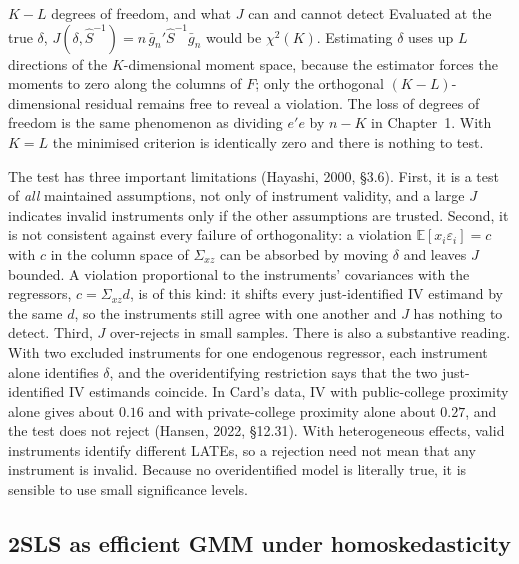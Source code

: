 \documentclass[11pt,a4paper]{article}
\newcommand{\E}{\mathbb{E}}
\newcommand{\sxz}{\Sigma_{xz}}
\begin{document}
\begin{whybox}{$K-L$ degrees of freedom, and what $J$ can and cannot detect}
Evaluated at the true $\delta$, $J(\delta,\hat S^{-1})=n\,\bar g_n'\hat S^{-1}\bar g_n$ would be $\chi^2(K)$. Estimating $\delta$ uses up $L$ directions of the $K$-dimensional moment space, because the estimator forces the moments to zero along the columns of $F$; only the orthogonal $(K-L)$-dimensional residual remains free to reveal a violation. The loss of degrees of freedom is the same phenomenon as dividing $e'e$ by $n-K$ in Chapter~1. With $K=L$ the minimised criterion is identically zero and there is nothing to test.

The test has three important limitations (Hayashi, 2000, \S3.6). First, it is a test of \emph{all} maintained assumptions, not only of instrument validity, and a large $J$ indicates invalid instruments only if the other assumptions are trusted. Second, it is not consistent against every failure of orthogonality: a violation $\E[x_i\varepsilon_i]=c$ with $c$ in the column space of $\sxz$ can be absorbed by moving $\delta$ and leaves $J$ bounded. A violation proportional to the instruments' covariances with the regressors, $c=\sxz d$, is of this kind: it shifts every just-identified IV estimand by the same $d$, so the instruments still agree with one another and $J$ has nothing to detect. Third, $J$ over-rejects in small samples. There is also a substantive reading. With two excluded instruments for one endogenous regressor, each instrument alone identifies $\delta$, and the overidentifying restriction says that the two just-identified IV estimands coincide. In Card's data, IV with public-college proximity alone gives about $0.16$ and with private-college proximity alone about $0.27$, and the test does not reject (Hansen, 2022, \S12.31). With heterogeneous effects, valid instruments identify different LATEs, so a rejection need not mean that any instrument is invalid. Because no overidentified model is literally true, it is sensible to use small significance levels.
\end{whybox}

\subsection{2SLS as efficient GMM under homoskedasticity}\label{sec:2sls}
\end{document}

